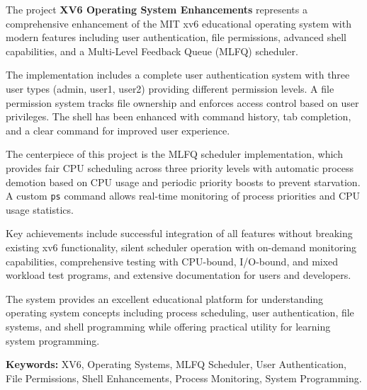 \documentclass[a4paper,12pt]{report}
\begin{document}
The project \textbf{XV6 Operating System Enhancements} represents a comprehensive enhancement of the MIT xv6 educational operating system with modern features including user authentication, file permissions, advanced shell capabilities, and a Multi-Level Feedback Queue (MLFQ) scheduler.

\par

The implementation includes a complete user authentication system with three user types (admin, user1, user2) providing different permission levels. A file permission system tracks file ownership and enforces access control based on user privileges. The shell has been enhanced with command history, tab completion, and a clear command for improved user experience.

\par

The centerpiece of this project is the MLFQ scheduler implementation, which provides fair CPU scheduling across three priority levels with automatic process demotion based on CPU usage and periodic priority boosts to prevent starvation. A custom \texttt{ps} command allows real-time monitoring of process priorities and CPU usage statistics.

\par

Key achievements include successful integration of all features without breaking existing xv6 functionality, silent scheduler operation with on-demand monitoring capabilities, comprehensive testing with CPU-bound, I/O-bound, and mixed workload test programs, and extensive documentation for users and developers.

\par

The system provides an excellent educational platform for understanding operating system concepts including process scheduling, user authentication, file systems, and shell programming while offering practical utility for learning system programming.

\par

\textbf{Keywords:} XV6, Operating Systems, MLFQ Scheduler, User Authentication, File Permissions, Shell Enhancements, Process Monitoring, System Programming.

\makeatletter
\let\l@table\l@figure
\renewcommand\listoffigures{%
    \section*{\listfigurename}%
    \@mkboth{\MakeUppercase\listfigurename}{\MakeUppercase\listfigurename}%
    \@starttoc{lof}%
}
\renewcommand\listoftables{%
    \section*{\listtablename}%
    \@mkboth{\MakeUppercase\listtablename}{\MakeUppercase\listtablename}%
    \@starttoc{lot}%
}
\makeatother
\end{document}
